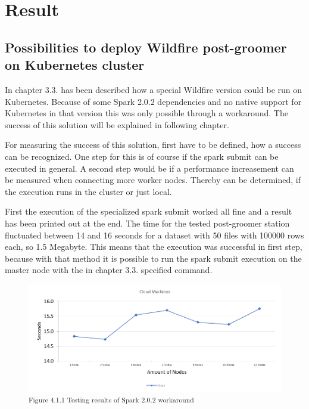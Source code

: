 
\chapter{Result}

\section{Possibilities to deploy Wildfire post-groomer on Kubernetes cluster}

In chapter 3.3. has been described how a special Wildfire version could be run on Kubernetes. Because of some Spark 2.0.2 dependencies and no native support for Kubernetes in that version this was only possible through a workaround. The success of this solution will be explained in following chapter.

For measuring the success of this solution, first have to be defined, how a success can be recognized. One step for this is of course if the spark submit can be executed in general. A second step would be if a performance increasement can be measured when connecting more worker nodes. Thereby can be determined, if the execution runs in the cluster or just local.

First the execution of the specialized spark submit worked all fine and a result has been printed out at the end. The time for the tested post-groomer station fluctuated between 14 and 16 seconds for a dataset with 50 files with 100000 rows each, so 1.5 Megabyte. This means that the execution was successful in first step, because with that method it is possible to run the spark submit execution on the master node with the in chapter 3.3. specified command.

\begin{figure}[b]
\centering
\includegraphics[width=\textwidth/5*4]{images/workaround_testing_results.png}
\textsuperscript{Figure 4.1.1 Testing results of Spark 2.0.2 workaround}
\end{figure}

